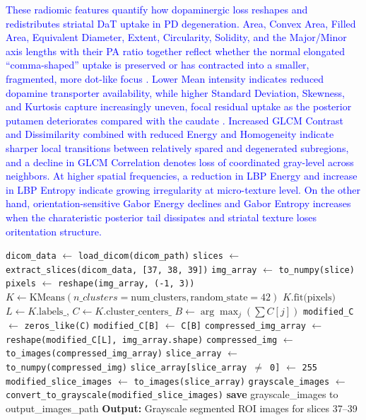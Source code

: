 \documentclass{article}
\begin{document}
\textcolor{blue}{These radiomic features quantify how dopaminergic loss reshapes and redistributes striatal DaT uptake in PD degeneration. Area, Convex Area, Filled Area, Equivalent Diameter, Extent, Circularity, Solidity, and the Major/Minor axis lengths with their PA ratio together reflect whether the normal elongated “comma-shaped” uptake is preserved or has contracted into a smaller, fragmented, more dot-like focus \cite{morbelli2020eanm, mercer2024practical}. Lower Mean intensity indicates reduced dopamine transporter availability, while higher Standard Deviation, Skewness, and Kurtosis capture increasingly uneven, focal residual uptake as the posterior putamen deteriorates compared with the caudate \cite{mayerhoefer2020introduction}. Increased GLCM Contrast and Dissimilarity combined with reduced Energy and Homogeneity indicate sharper local transitions between relatively spared and degenerated subregions, and a decline in GLCM Correlation denotes loss of coordinated gray-level across neighbors. At higher spatial frequencies, a reduction in LBP Energy and increase in LBP Entropy indicate growing irregularity at micro-texture level. On the other hand, orientation-sensitive Gabor Energy declines and Gabor Entropy increases when the charateristic posterior tail dissipates and striatal texture loses oritentation structure.}

\begin{algorithm} [ht!]
\caption{K-Means Clustering for Radiomics Processing}
\label{algo1}
\begin{algorithmic}[1]
    \State \texttt{dicom\_data} $\gets$ \texttt{load\_dicom(dicom\_path)}
    \State \texttt{slices} $\gets$ \texttt{extract\_slices(dicom\_data, [37, 38, 39])}
        \State \texttt{img\_array} $\gets$ \texttt{to\_numpy(slice)}
        \State \texttt{pixels} $\gets$ \texttt{reshape(img\_array, (-1, 3))}
        \State $K \gets \text{KMeans}(n\_clusters = \text{num\_clusters}, \text{random\_state}=42)$
        \State $K.\text{fit(pixels)}$
        \State $L \gets K.\text{labels\_}$, \quad $C \gets K.\text{cluster\_centers\_}$
        \State $B \gets \arg\max_j(\sum C[j])$
        \State \texttt{modified\_C} $\gets$ \texttt{zeros\_like(C)}
        \State \texttt{modified\_C[B]} $\gets$ \texttt{C[B]}
        \State \texttt{compressed\_img\_array} $\gets$ \texttt{reshape(modified\_C[L], img\_array.shape)}
        \State \texttt{compressed\_img} $\gets$ \texttt{to\_images(compressed\_img\_array)}
        \State \texttt{slice\_array} $\gets$ \texttt{to\_numpy(compressed\_img)}
        \State \texttt{slice\_array[slice\_array $\neq$ 0]} $\gets$ \texttt{255}
        \State \texttt{modified\_slice\_images} $\gets$ \texttt{to\_images(slice\_array)}
        \State \texttt{grayscale\_images} $\gets$ \texttt{convert\_to\_grayscale(modified\_slice\_images)}
        \State \textbf{save} grayscale\_images to output\_images\_path
    \EndFor
    \State \textbf{Output:} Grayscale segmented ROI images for slices 37--39
\EndProcedure
\end{algorithmic}
\end{algorithm}
\end{document}
